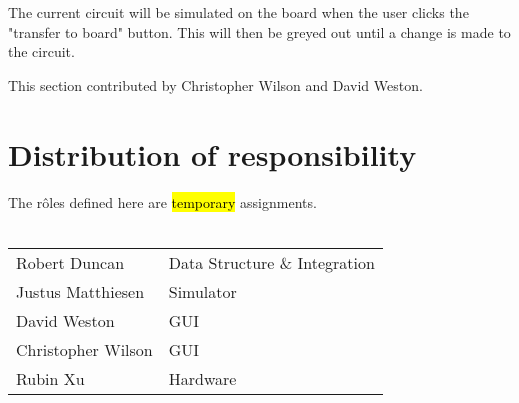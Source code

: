 \documentclass[12pt, a4paper, oneside,titlepage]{article}
\begin{document}
The current circuit will be simulated on the board when the user clicks the "transfer to board" button. This will then be greyed out until a change is made to the circuit.

This section contributed by Christopher Wilson and David Weston.

\section{Distribution of responsibility}
The r\^oles defined here are \hl{temporary} assignments. \\ \\ 
\begin{tabular}{l l}
Robert Duncan & Data Structure \& Integration\\ 
Justus Matthiesen & Simulator \\
David Weston & GUI \\
Christopher Wilson & GUI \\
Rubin Xu & Hardware \\
\end{tabular}
\end{document}

